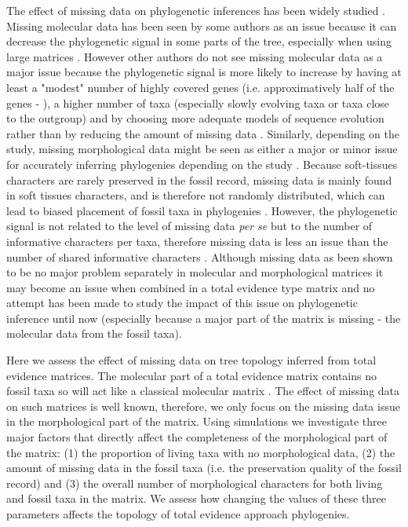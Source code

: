 \documentclass[12pt,letterpaper]{article}
\begin{document}
The effect of missing data on phylogenetic inferences has been widely studied \citep{wiensmissing2003,wiensmissing2006,wiensmissing2008,lemmonthe2009,rouresite-specific2011,sansomfossilization2013}.
Missing molecular data has been seen by some authors as an issue because it can decrease the phylogenetic signal in some parts of the tree, especially when using large matrices \citep{lemmonthe2009}.
However other authors do not see missing molecular data as a major issue because the phylogenetic signal is more likely to increase by having at least a "modest" number of highly covered genes (i.e. approximatively half of the genes - \citet{rouresite-specific2011}), a higher number of taxa (especially slowly evolving taxa or taxa close to the outgroup) and by choosing more adequate models of sequence evolution rather than by reducing the amount of missing data \citep{wiensmissing2006,wiensmissing2008,rouresite-specific2011}.
Similarly, depending on the study, missing morphological data might be seen as either a major or minor issue for accurately inferring phylogenies depending on the study \citep{wiensmissing2003,sansomfossilization2013}.
Because soft-tissues characters are rarely preserved in the fossil record, missing data is mainly found in soft tissues characters, and is therefore not randomly distributed, which can lead to biased placement of fossil taxa in phylogenies \citep{sansomfossilization2013}.
However, the phylogenetic signal is not related to the level of missing data \textit{per se} but to the number of informative characters per taxa, therefore missing data is less an issue than the number of shared informative characters \citep{wiensmissing2003}.
Although missing data as been shown to be no major problem separately in molecular and morphological matrices \citep{wiensmissing2003,wiensmissing2006,wiensmissing2008,rouresite-specific2011} it may become an issue when combined in a total evidence type matrix and no attempt has been made to study the impact of this issue on phylogenetic inference until now (especially because a major part of the matrix is missing - the molecular data from the fossil taxa). %

Here we assess the effect of missing data on tree topology inferred from total evidence matrices.
The molecular part of a total evidence matrix contains no fossil taxa so will act like a classical molecular matrix \citep{ronquista2012}.
The effect of missing data on such matrices is well known, therefore, we only focus on the missing data issue in the morphological part of the matrix.
Using simulations we investigate three major factors that directly affect the completeness of the morphological part of the matrix:
(1) the proportion of living taxa with no morphological data,
(2) the amount of missing data in the fossil taxa (i.e. the preservation quality of the fossil record) and
(3) the overall number of morphological characters for both living and fossil taxa in the matrix.
We assess how changing the values of these three parameters affects the topology of total evidence approach phylogenies.
\end{document}
